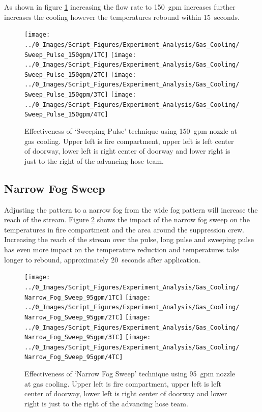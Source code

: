 \documentclass[12pt,oneside]{book}
\begin{document}
As shown in figure \ref{fig:gas_sweep_pulse_150} increasing the flow rate to 150~gpm increases further increases the cooling however the temperatures rebound within 15~seconds. 

\begin{figure}[H]
\centering
\texttt{[image: ../0\_Images/Script\_Figures/Experiment\_Analysis/Gas\_Cooling/Sweep\_Pulse\_150gpm/1TC]}
\texttt{[image: ../0\_Images/Script\_Figures/Experiment\_Analysis/Gas\_Cooling/Sweep\_Pulse\_150gpm/2TC]}
\texttt{[image: ../0\_Images/Script\_Figures/Experiment\_Analysis/Gas\_Cooling/Sweep\_Pulse\_150gpm/3TC]}
\texttt{[image: ../0\_Images/Script\_Figures/Experiment\_Analysis/Gas\_Cooling/Sweep\_Pulse\_150gpm/4TC]}
\caption[Gas Cooling - Sweeping Pulse 150~gpm]{Effectiveness of `Sweeping Pulse' technique using 150~gpm nozzle at gas cooling. Upper left is fire compartment, upper left is left center of doorway, lower left is right center of doorway and lower right is just to the right of the advancing hose team.}
\label{fig:gas_sweep_pulse_150}
\end{figure}


\subsection {Narrow Fog Sweep}
Adjusting the pattern to a narrow fog from the wide fog pattern will increase the reach of the stream. Figure \ref{fig:gas_narrow_fog_95} shows the impact of the narrow fog sweep on the temperatures in fire compartment and the area around the suppression crew. Increasing the reach of the stream over the pulse, long pulse and sweeping pulse has even more impact on the temperature reduction and temperatures take longer to rebound, approximately 20~seconds after application.

\begin{figure}[H]
\centering
\texttt{[image: ../0\_Images/Script\_Figures/Experiment\_Analysis/Gas\_Cooling/Narrow\_Fog\_Sweep\_95gpm/1TC]}
\texttt{[image: ../0\_Images/Script\_Figures/Experiment\_Analysis/Gas\_Cooling/Narrow\_Fog\_Sweep\_95gpm/2TC]}
\texttt{[image: ../0\_Images/Script\_Figures/Experiment\_Analysis/Gas\_Cooling/Narrow\_Fog\_Sweep\_95gpm/3TC]}
\texttt{[image: ../0\_Images/Script\_Figures/Experiment\_Analysis/Gas\_Cooling/Narrow\_Fog\_Sweep\_95gpm/4TC]}
\caption[Gas Cooling - Narrow Fog Sweep 95~gpm]{Effectiveness of `Narrow Fog Sweep' technique using 95~gpm nozzle at gas cooling. Upper left is fire compartment, upper left is left center of doorway, lower left is right center of doorway and lower right is just to the right of the advancing hose team.}
\label{fig:gas_narrow_fog_95}
\end{figure}
\end{document}
